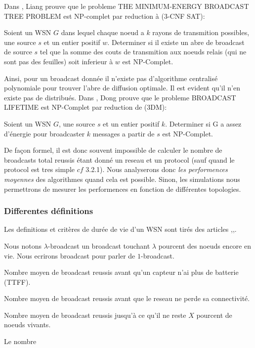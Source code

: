Dans \cite{Liang2002}, Liang prouve que le  probleme THE MINIMUM-ENERGY BROADCAST
TREE PROBLEM est NP-complet par reduction à (3-CNF SAT):
\begin{myth}
Soient un WSN $G$ dans lequel chaque noeud a $k$ rayons de transmition possibles, une source $s$ et un entier positif $w$.
Determiner si il existe un abre de broadcast de source $s$ tel que la somme des couts de transmition aux noeuds relais (qui ne sont pas des feuilles) soit inferieur à $w$ est NP-Complet.
\end{myth}
Ainsi, pour un broadcast donnée il n'existe pas d'algorithme centralisé polynomiale pour trouver l'abre de diffusion optimale. Il est evident qu'il n'en existe pas de distribués. 
Dans \cite{Dong2005}, Dong prouve que le  probleme BROADCAST LIFETIME est NP-Complet par reduction de (3DM):
\begin{myth}
Soient un WSN $G$, une source $s$ et un entier positif $k$.
Determiner si G a assez d'énergie pour broadcaster $k$ messages a partir de $s$ est NP-Complet.
\end{myth}

De façon formel, il est donc souvent impossible de calculer le nombre de broadcasts total reussis étant donné un reseau et un protocol (sauf quand le protocol est tres simple $cf$ 3.2.1). Nous analyserons 
donc \textit{les performences moyennes} des algorithmes quand cela est possible. Sinon, les simulations nous permettrons de mesurer les performences en fonction de différentes topologies.

\subsubsection{Differentes définitions}
Les definitions et critères de durée de vie d'un WSN sont tirés des articles \cite{Dietrich2009},\cite{Champ2009lifetime},\cite{Elleithy2011}. 

\begin{mydef}
Nous notons $\lambda$-broadcast un broadcast touchant $\lambda$ pourcent des noeuds encore en vie. Nous ecrirons broadcast pour parler de $1$-broadcast.
\end{mydef}

\begin{mylt}
Nombre moyen de broadcast reussis avant qu'un capteur n'ai plus de batterie (TTFF).
\end{mylt}
\begin{mylt}
Nombre moyen de broadcast reussis avant que le reseau ne perde sa connectivité.
\end{mylt}
\begin{mylt}
Nombre moyen de broadcast reussis jusqu'à ce qu'il ne reste $X$ pourcent de noeuds vivants.
\end{mylt}
\begin{mylt}
Le nombre 
\end{mylt}



